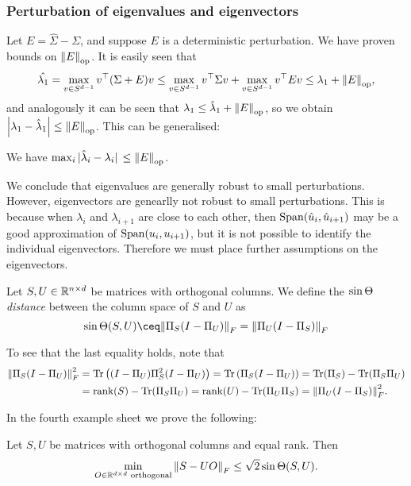 \subsubsection{Perturbation of eigenvalues and eigenvectors}
Let $E = \hat\Sigma - \Sigma$, and suppose $E$ is a deterministic perturbation. We have proven bounds on $\norm{E}_\mathrm{op}$. It is easily seen that
\[
\hat{\lambda_1} = \max_{v \in S^{d-1}} v^\top (\Sigma + E)v \leq\max_{v \in S^{d-1}} v^\top \Sigma v + \max_{v \in S^{d-1}} v^\top E v  \leq \lambda_1 + \norm{E}_\mathrm{op}, 
\]
and analogously it can be seen that $\lambda_1 \leq \hat\lambda_1 + \norm{E}_\mathrm{op}$, so we obtain $\abs{\lambda_1 - \hat\lambda_1} \leq \norm{E}_\mathrm{op}$. This can be generalised:
\begin{theorem}[Weyl]
	We have $\max_i \abs*{\hat\lambda_i - \lambda_i} \leq \norm{E}_\mathrm{op}$. 
\end{theorem}

We conclude that eigenvalues are generally robust to small perturbations. However, eigenvectors are genearlly not robust to small perturbations. This is because when $\lambda_i$ and $\lambda_{i+1}$ are close to each other, then $\operatorname{Span}(\hat u_i, \hat u_{i+1})$ may be a good approximation of $\operatorname{Span}(u_i, u_{i+1})$, but it is not possible to identify the individual eigenvectors.  Therefore we must place further assumptions on the eigenvectors. 

\begin{definition}
	Let $S, U \in \mathbb R^{n \times d}$ be matrices with orthogonal columns. We define the \emph{$\sin\Theta$ distance} between the column space of $S$ and $U$ as
	\[
	\sint(S,U) \ceq \norm{\Pi_S(I - \Pi_U)}_F = \norm{\Pi_U(I - \Pi_S)}_F
	\]
\end{definition}
To see that the last equality holds, note that
\begin{align*}
	\norm{\Pi_S(I - \Pi_U)}_F^2 &= \Tr\qty((I - \Pi_U) \Pi_S^2 (I - \Pi_U)) = \Tr\qty(\Pi_S(I - \Pi_U)) = \Tr(\Pi_S) - \Tr(\Pi_S\Pi_U) \\
	&= \rank(S) - \Tr(\Pi_S\Pi_U) = \rank(U) - \Tr(\Pi_U\Pi_S) = \norm{\Pi_U(I - \Pi_S)}_F^2. 
\end{align*}

In the fourth example sheet we prove the following:
\begin{proposition} \label{prop:sint_distance}
	Let $S, U$ be matrices with orthogonal columns and equal rank. Then
	\[
	\min_{O \in \mathbb R^{d \times d} \text{ }\mathrm{orthogonal}} \norm{S - UO}_F \leq \sqrt2 \sin\Theta(S, U). 
	\]
\end{proposition}

